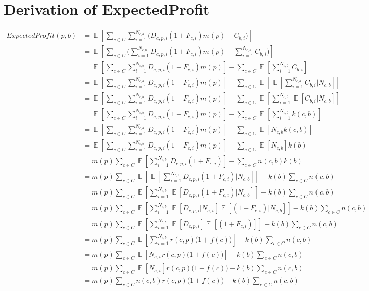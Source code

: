 \documentclass[11pt]{article} %
\DeclareMathOperator{\EX}{\mathbb{E}}
\begin{document}
\section{Derivation of ExpectedProfit}\label{sec.DerExpProf}
\begin{align*}
ExpectedProfit(p,b) 
&= \EX\left[\sum_{c \in C}{\sum_{i =1}^{N_{c,b}}{\bigg( D_{c,p,i}(1+F_{c,i})m(p)-C_{b,i}\bigg)}}\right]\\
&= \EX\left[\sum_{c \in C}{\bigg(\sum_{i =1}^{N_{c,b}}{ D_{c,p,i}(1+F_{c,i})m(p)}-\sum_{i =1}^{N_{c,b}}C_{b,i}\bigg)}\right]\\
&= \EX\left[\sum_{c \in C}{\sum_{i =1}^{N_{c,b}}{ D_{c,p,i}(1+F_{c,i})m(p)}}\right]-\sum_{c \in C}{\EX\left[\sum_{i =1}^{N_{c,b}}C_{b,i}\right]}\\
&= \EX\left[\sum_{c \in C}{\sum_{i =1}^{N_{c,b}}{ D_{c,p,i}(1+F_{c,i})m(p)}}\right]-\sum_{c \in C}{\EX\left[\EX\left[\sum_{i =1}^{N_{c,b}}C_{b,i}\bigg|N_{c,b}\right]\right]}\\
&= \EX\left[\sum_{c \in C}{\sum_{i =1}^{N_{c,b}}{ D_{c,p,i}(1+F_{c,i})m(p)}}\right]-\sum_{c \in C}{\EX\left[\sum_{i =1}^{N_{c,b}}\EX\left[C_{b,i}\bigg|N_{c,b}\right]\right]}\\
&= \EX\left[\sum_{c \in C}{\sum_{i =1}^{N_{c,b}}{ D_{c,p,i}(1+F_{c,i})m(p)}}\right]-\sum_{c \in C}{\EX\left[\sum_{i =1}^{N_{c,b}}k(c,b)\right]}\\
&= \EX\left[\sum_{c \in C}{\sum_{i =1}^{N_{c,b}}{ D_{c,p,i}(1+F_{c,i})m(p)}}\right]-\sum_{c \in C}{\EX\left[N_{c,b}k(c,b)\right]}\\
&= \EX\left[\sum_{c \in C}{\sum_{i =1}^{N_{c,b}}{ D_{c,p,i}(1+F_{c,i})m(p)}}\right]-\sum_{c \in C}{\EX[N_{c,b}]k(b)}\\
&= m(p)\sum_{c \in C}{\EX\left[\sum_{i =1}^{N_{c,b}}{ D_{c,p,i}(1+F_{c,i})}\right]}-\sum_{c \in C}{n(c,b)k(b)}\\
&= m(p)\sum_{c \in C}{\EX\left[\EX\left[\sum_{i =1}^{N_{c,b}}{ D_{c,p,i}(1+F_{c,i})}\Bigg|N_{c,b}\right]\right]}-k(b)\sum_{c \in C}{n(c,b)}\\
&= m(p)\sum_{c \in C}{\EX\left[\sum_{i =1}^{N_{c,b}}{\EX\left[D_{c,p,i}(1+F_{c,i})\bigg|N_{c,b}\right]}\right]}-k(b)\sum_{c \in C}{n(c,b)}\\
&= m(p)\sum_{c \in C}{\EX\left[\sum_{i =1}^{N_{c,b}}{\EX\left[D_{c,p,i}\bigg|N_{c,b}\right]\EX\left[(1+F_{c,i})\bigg|N_{c,b}\right]}\right]}-k(b)\sum_{c \in C}{n(c,b)}\\
&= m(p)\sum_{c \in C}{\EX\left[\sum_{i =1}^{N_{c,b}}{\EX\left[D_{c,p,i}\right]\EX\left[(1+F_{c,i})\right]}\right]}-k(b)\sum_{c \in C}{n(c,b)}\\
&= m(p)\sum_{c \in C}{\EX\left[\sum_{i =1}^{N_{c,b}}{r(c,p)\Big(1+f(c)\Big)}\right]}-k(b)\sum_{c \in C}{n(c,b)}\\
&= m(p)\sum_{c \in C}{\EX\left[N_{c,b}r(c,p)\Big(1+f(c)\Big)\right]}-k(b)\sum_{c \in C}{n(c,b)}\\
&= m(p)\sum_{c \in C}{\EX\left[N_{c,b}\right]r(c,p)\Big(1+f(c)\Big)}-k(b)\sum_{c \in C}{n(c,b)}\\
&= m(p)\sum_{c \in C}{n(c,b)r(c,p)\Big(1+f(c)\Big)}-k(b)\sum_{c \in C}{n(c,b)}
\end{align*}
\end{document}
